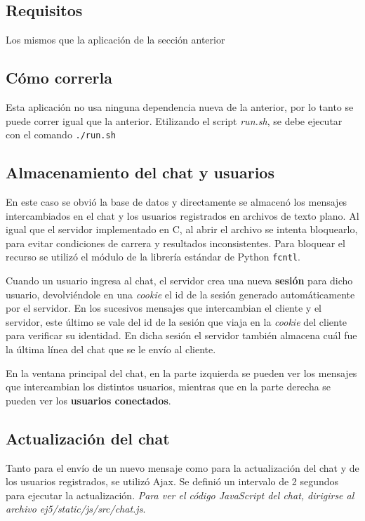 \subsection{Requisitos}

Los mismos que la aplicación de la sección anterior

\subsection{Cómo correrla}

Esta aplicación no usa ninguna dependencia nueva de la anterior, por lo tanto se puede correr igual que la anterior. Etilizando el script \emph{run.sh}, se debe ejecutar con el comando \texttt{./run.sh} 

\subsection{Almacenamiento del chat y usuarios}

En este caso se obvió la base de datos y directamente se almacenó los mensajes intercambiados en el chat y los usuarios registrados en archivos de texto plano. Al igual que el servidor implementado en C, al abrir el archivo se intenta bloquearlo, para evitar condiciones de carrera y resultados inconsistentes. Para bloquear el recurso se utilizó el módulo de la librería estándar de Python \texttt{fcntl}. 

Cuando un usuario ingresa al chat, el servidor crea una nueva \textbf{sesión} para dicho usuario, devolviéndole en una \emph{cookie} el id de la sesión generado automáticamente por el servidor. En los sucesivos mensajes que intercambian el cliente y el servidor, este último se vale del id de la sesión que viaja en la \emph{cookie} del cliente para verificar su identidad. En dicha sesión el servidor también almacena cuál fue la última línea del chat que se le envío al cliente.

En la ventana principal del chat, en la parte izquierda se pueden ver los mensajes que intercambian los distintos usuarios, mientras que en la parte derecha se pueden ver los \textbf{usuarios conectados}. 

\subsection{Actualización del chat}

Tanto para el envío de un nuevo mensaje como para la actualización del chat y de los usuarios registrados, se utilizó Ajax. Se definió un intervalo de 2 segundos para ejecutar la actualización. \emph{Para ver el código JavaScript del chat, dirigirse al archivo ej5/static/js/src/chat.js}.


